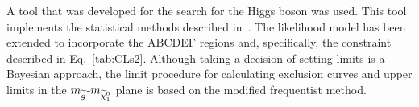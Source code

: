 A tool that was developed for the search for the Higgs boson was used. This tool implements the statistical methods described in~\cite{CLs2}. The likelihood model has been extended to incorporate the ABCDEF regions and, specifically, the constraint described in Eq.~\ref{tab:CLs2}.
Although taking a decision of setting limits is a Bayesian approach, the limit procedure for calculating exclusion curves and upper limits in the $m_{\widetilde{g}}$-$m_{\widetilde{\chi}^0_1}$ plane is based on the modified frequentist method. 
